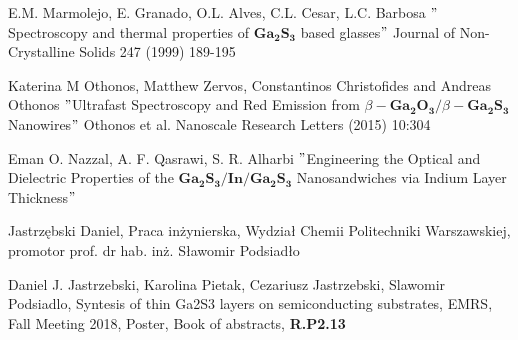 \begin{thebibliography}{}
	 E.M. Marmolejo, E. Granado, O.L. Alves, C.L. Cesar, L.C. Barbosa $"$Spectroscopy and thermal properties of $\mathbf{Ga_{2}S_{3}}$ based glasses$"$ Journal of Non-Crystalline Solids 247 (1999) 189-195
	
	 Katerina M Othonos, Matthew Zervos, Constantinos Christofides and Andreas Othonos $"$Ultrafast Spectroscopy and Red Emission
	from $\beta-\mathbf{Ga_{2}O_{3}}/\beta-\mathbf{Ga_{2}S_{3}}$ Nanowires$"$ Othonos et al. Nanoscale Research Letters (2015) 10:304
	
	 Eman O. Nazzal, A. F. Qasrawi, S. R. Alharbi $"$Engineering the Optical and Dielectric Properties
	of the $\mathbf{Ga_{2}S_{3}/In/Ga_{2}S_{3}}$ Nanosandwiches via Indium Layer
	Thickness$"$
	
	 Jastrzębski Daniel, Praca inżynierska, Wydział Chemii Politechniki Warszawskiej, promotor prof. dr hab. inż. Sławomir Podsiadło
	
	 Daniel J. Jastrzebski, Karolina Pietak, Cezariusz Jastrzebski, Slawomir Podsiadlo, Syntesis of thin Ga2S3 layers on semiconducting substrates, EMRS, Fall Meeting 2018, Poster, Book of abstracts, \textbf{R.P2.13}
	
\end{thebibliography}














